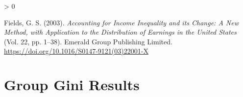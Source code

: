 \documentclass[
  11pt,
a4paper
]{article}
\newlength{\cslhangindent}
\newenvironment{CSLReferences}[2] %
 {%
  \setlength{\parindent}{0pt}
  \ifodd #1 \everypar{\setlength{\hangindent}{\cslhangindent}}\ignorespaces\fi
  \ifnum #2 > 0
  \setlength{\parskip}{#2\baselineskip}
  \fi
 }%
 {}
\begin{document}
\hypertarget{refs}{}
\begin{CSLReferences}{1}{0}
\leavevmode\hypertarget{ref-Fields2003}{}%
Fields, G. S. (2003). \emph{{Accounting for Income Inequality and its Change: A New Method, with Application to the Distribution of Earnings in the United States}} (Vol. 22, pp. 1--38). Emerald Group Publishing Limited. \url{https://doi.org/10.1016/S0147-9121(03)22001-X}

\end{CSLReferences}

\appendix
\clearpage

\hypertarget{group-gini-results}{%
\section{Group Gini Results}\label{group-gini-results}}
\end{document}
